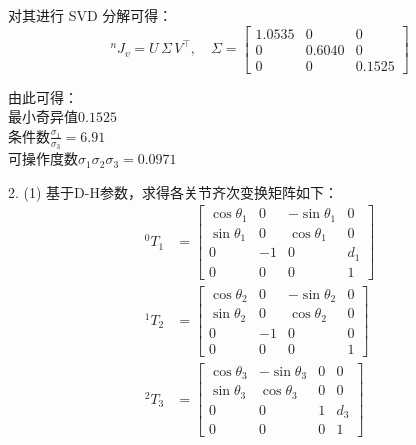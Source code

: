 \documentclass[UTF8, 12pt]{ctexart}
\begin{document}
对其进行 SVD 分解可得：
\[
{}^n J_v = U\, \Sigma\, V^{\top},\quad
\Sigma = \begin{bmatrix}
            1.0535 & 0 & 0 \\
            0 & 0.6040 & 0 \\
            0 & 0 & 0.1525
        \end{bmatrix}
\]

由此可得： \\
最小奇异值\(0.1525\) \\
条件数\(\frac{\sigma_1}{\sigma_3} = 6.91\) \\
可操作度数\(\sigma_1 \sigma_2 \sigma_3 = 0.0971\)
\newpage



2.
(1)
基于D-H参数，求得各关节齐次变换矩阵如下：
\[
\begin{aligned}
    {}^0 T_1 &= \begin{bmatrix}
                    \cos\theta_1 & 0 & -\sin\theta_1 & 0 \\
                    \sin\theta_1 & 0 & \cos\theta_1 & 0 \\
                    0 & -1 & 0 & d_1 \\
                    0 & 0 & 0 & 1
                \end{bmatrix} \\
    {}^1 T_2 &= \begin{bmatrix}
                    \cos\theta_2 & 0 & -\sin\theta_2 & 0 \\
                    \sin\theta_2 & 0 & \cos\theta_2 & 0 \\
                    0 & -1 & 0 & 0 \\
                    0 & 0 & 0 & 1
                \end{bmatrix} \\
    {}^2 T_3 &= \begin{bmatrix}
                    \cos\theta_3 & -\sin\theta_3 & 0 & 0 \\
                    \sin\theta_3 & \cos\theta_3 & 0 & 0 \\
                    0 & 0 & 1 & d_3 \\
                    0 & 0 & 0 & 1
                \end{bmatrix} \\
\end{aligned}
\]
\end{document}
